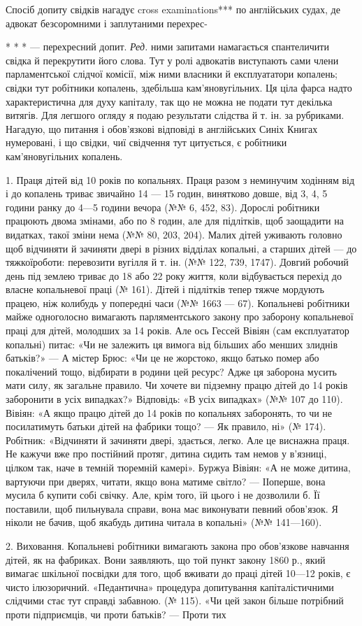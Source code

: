 Спосіб допиту свідків нагадує cross examinations*** по англійських
судах, де адвокат безсоромними і заплутаними перехрес-

* * * — перехресний допит. \emph{Ред.}
ними запитами намагається спантеличити свідка й перекрутити
його слова. Тут у ролі адвокатів виступають сами члени парламентської
слідчої комісії, між ними власники й експлуататори копалень;
свідки тут робітники копалень, здебільша кам’яновугільних.
Ця ціла фарса надто характеристична для духу капіталу, так що
не можна не подати тут декілька витягів. Для легшого огляду
я подаю результати слідства й т. ін. за рубриками. Нагадую, що
питання і обов’язкові відповіді в англійських Синіх Книгах
нумеровані, і що свідки, чиї свідчення тут цитується, є робітники
кам’яновугільних копалень.

1. Праця дітей від 10 років по копальнях. Праця разом з
неминучим ходінням від і до копалень триває звичайно 14 —
15 годин, винятково довше, від 3, 4, 5 години ранку до 4—5 години
вечора (№№ 6, 452, 83). Дорослі робітники працюють двома
змінами, або по 8 годин, але для підлітків, щоб заощадити на
видатках, такої зміни нема (№№ 80, 203, 204). Малих дітей уживають
головно щоб відчиняти й зачиняти двері в різних відділах
копальні, а старших дітей — до тяжкоїроботи: перевозити вугілля
й т. ін. (№№ 122, 739, 1747). Довгий робочий день під землею
триває до 18 або 22 року життя, коли відбувається перехід до
власне копальневої праці (№ 161). Дітей і підлітків тепер тяжче
мордують працею, ніж колибудь у попередні часи (№№ 1663 —
67). Копальневі робітники майже одноголосно вимагають парляментського
закону про заборону копальневої праці для дітей,
молодших за 14 років. Але ось Гессей Вівіян (сам експлуататор
копальні) питає: «Чи не залежить ця вимога від більших або
менших злиднів батьків?» — А містер Брюс: «Чи це не жорстоко,
якщо батько помер або покалічений тощо, відбирати в родини
цей ресурс? Адже ця заборона мусить мати силу, як загальне
правило. Чи хочете ви підземну працю дітей до 14 років заборонити
в усіх випадках?» Відповідь: «В усіх випадках» (№№ 107
до 110). Вівіян: «А якщо працю дітей до 14 років по копальнях
заборонять, то чи не посилатимуть батьки дітей на фабрики
тощо? — Як правило, ні» (№ 174). Робітник: «Відчиняти й зачиняти
двері, здається, легко. Але це виснажна праця. Не кажучи
вже про постійний протяг, дитина сидить там немов у в’язниці,
цілком так, наче в темній тюремній камері». Буржуа Вівіян:
«А не може дитина, вартуючи при дверях, читати, якщо вона
матиме світло? — ІІоперше, вона мусила б купити собі свічку.
Але, крім того, їй цього і не дозволили б. Її поставили, щоб пильнувала
справи, вона має виконувати певний обов’язок. Я ніколи
не бачив, щоб якабудь дитина читала в копальні» (№№ 141—160).

2. Виховання. Копальневі робітники вимагають закона про
обов’язкове навчання дітей, як на фабриках. Вони заявляють,
що той пункт закону 1860 р., який вимагає шкільної посвідки для
того, щоб вживати до праці дітей 10—12 років, є чисто ілюзоричний.
«Педантична» процедура допитування капіталістичними
слідчими стає тут справді забавною. (№ 115). «Чи цей закон більше
потрібний проти підприємців, чи проти батьків? — Проти тих
\parbreak{}  %
